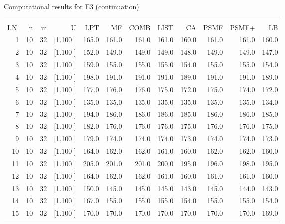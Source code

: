 \documentclass[12pt,a4paper]{article}
\begin{document}
\newpage
\begin{center}
 Computational results for E3 (continuation) {\tiny
\begin{tabular}{r r r r r r r r r r r r}\hline
    &   &   &          &        &        &        &        &        &        &        &       \\[-0.1in]
  I.N.  &  n  &  m  &  U  &  LPT  &  MF  &  COMB  &  LIST  &  CA  & PSMF &PSMF+ & LB \\[0.03in]
\hline
   1& 10& 32&[1.100     ]&   165.0&   161.0&   161.0&   161.0&   160.0&   161.0&   161.0&   160.0\\[-0.02in]
   2& 10& 32&[1.100     ]&   152.0&   149.0&   149.0&   149.0&   148.0&   149.0&   149.0&   147.0\\[-0.02in]
   3& 10& 32&[1.100     ]&   159.0&   155.0&   155.0&   155.0&   154.0&   155.0&   155.0&   154.0\\[-0.02in]
   4& 10& 32&[1.100     ]&   198.0&   191.0&   191.0&   191.0&   189.0&   191.0&   191.0&   189.0\\[-0.02in]
   5& 10& 32&[1.100     ]&   177.0&   176.0&   176.0&   175.0&   172.0&   175.0&   174.0&   172.0\\[-0.02in]
   6& 10& 32&[1.100     ]&   135.0&   135.0&   135.0&   135.0&   135.0&   135.0&   135.0&   134.0\\[-0.02in]
   7& 10& 32&[1.100     ]&   194.0&   186.0&   186.0&   186.0&   185.0&   186.0&   186.0&   185.0\\[-0.02in]
   8& 10& 32&[1.100     ]&   182.0&   176.0&   176.0&   176.0&   175.0&   176.0&   176.0&   175.0\\[-0.02in]
   9& 10& 32&[1.100     ]&   179.0&   174.0&   174.0&   174.0&   173.0&   174.0&   174.0&   173.0\\[-0.02in]
  10& 10& 32&[1.100     ]&   164.0&   162.0&   162.0&   161.0&   160.0&   162.0&   162.0&   160.0\\[-0.02in]
  11& 10& 32&[1.100     ]&   205.0&   201.0&   201.0&   200.0&   195.0&   196.0&   198.0&   195.0\\[-0.02in]
  12& 10& 32&[1.100     ]&   164.0&   162.0&   162.0&   161.0&   160.0&   161.0&   161.0&   160.0\\[-0.02in]
  13& 10& 32&[1.100     ]&   150.0&   145.0&   145.0&   145.0&   143.0&   145.0&   144.0&   143.0\\[-0.02in]
  14& 10& 32&[1.100     ]&   167.0&   155.0&   155.0&   155.0&   154.0&   155.0&   155.0&   154.0\\[-0.02in]
  15& 10& 32&[1.100     ]&   170.0&   170.0&   170.0&   170.0&   170.0&   170.0&   170.0&   169.0\\[-0.02in]

\end{tabular}}
\end{center}
\end{document}
